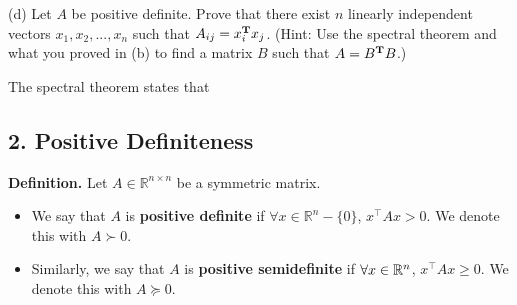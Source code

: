 \documentclass{article}
\begin{document}
(d) Let $A$ be positive definite. Prove that there exist $n$ linearly independent
vectors $x_1,x_2,...,x_n$ such that $A_{ij} = x_i^{\mathbf{T}} x_j$. (Hint: Use the spectral theorem
and what you proved in (b) to find a matrix $B$ such that $A = B^{\mathbf{T}} B$.)
\begin{mdframed}
  The spectral theorem states that
\end{mdframed}
\newpage

\subsection*{2. Positive Definiteness}
\textbf{Definition.} Let $A \in \mathbb{R}^{n \times n}$ be a symmetric matrix.
\begin{itemize}
    \item We say that $A$ is \textbf{positive definite} if $\forall x \in \mathbb{R}^n - \{0\}$, $x^{\top}Ax > 0$. We denote this with $A \succ 0$.
    \item Similarly, we say that $A$ is \textbf{positive semidefinite} if $\forall x \in \mathbb{R}^n$, $x^{\top}Ax \geq 0$. We denote this with $A \succeq 0$.
\end{itemize}
\end{document}

